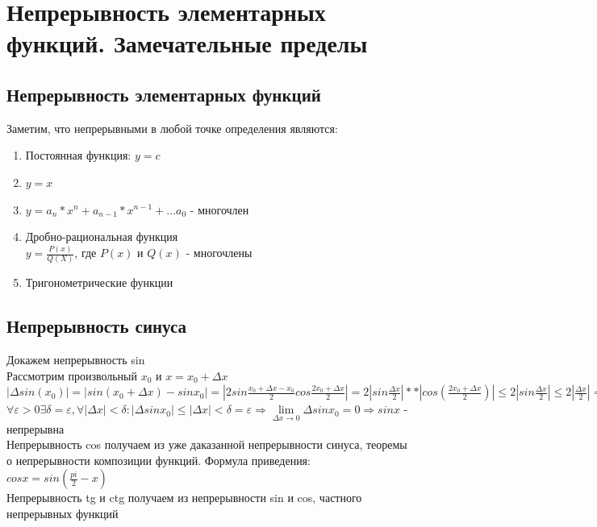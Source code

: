 \documentclass[oneside]{book}
\begin{document}
    \chapter{Непрерывность элементарных функций. Замечательные пределы}
\section{Непрерывность элементарных функций}
Заметим, что непрерывными в любой точке определения являются:
\begin{enumerate}
\item Постоянная функция: $y=c$
\item $y=x$
\item $y=a_n*x^n+a_{n-1}*x^{n-1}+...a_0$ - многочлен
\item Дробно-рациональная функция\\$y=\frac{P(x)}{Q(X)}$, где $P(x)$ и $Q(x)$ - многочлены
\item Тригонометрические функции
\end{enumerate}
\section{Непрерывность синуса}
Докажем непрерывность sin\\
Рассмотрим произвольный $x_0$ и $x=x_0+ \Delta x$\\
$|\Delta sin(x_0)| = |sin(x_0+ \Delta x)-sinx_0|=|2sin\frac{x_0+ \Delta x-x_0}{2}cos\frac{2x_0+ \Delta x}{2}|=2|sin\frac{\Delta x}{2}|**|cos(\frac{2x_0+\Delta x}{2})|\leq 2|sin\frac{\Delta x}{2}|\leq 2|\frac{\Delta x}{2}|=|\Delta x|\leq 1$\\
$\forall \varepsilon > 0 \exists \delta = \varepsilon, \forall |\Delta x| < \delta: |\Delta sinx_0|\leq |\Delta x| < \delta = \varepsilon \Rightarrow \lim \limits_{\Delta x \rightarrow 0}\Delta sinx_0=0\Rightarrow sinx$ - непрерывна\\
Непрерывность cos получаем из уже даказанной непрерывности синуса, теоремы о непрерывности композиции функций. Формула приведения:\\
$cosx=sin(\frac{pi}{2}-x)$\\
Непрерывность tg и ctg получаем из непрерывности sin и cos, частного непрерывных функций
\end{document}
